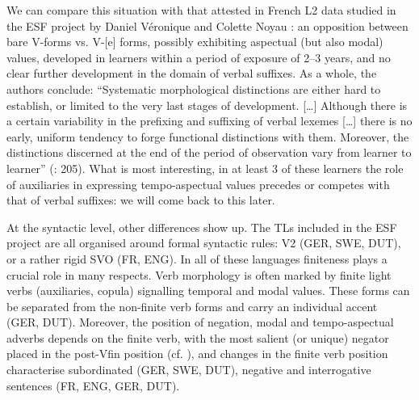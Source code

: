 \documentclass[output=paper]{langscibook}
\begin{document}
We can compare this situation with that attested in French L2 data studied in the ESF project by Daniel Véronique and Colette Noyau \citep{NoyauEtAl1995}: an opposition between bare V-forms vs. V-[e] forms, possibly exhibiting aspectual (but also modal) values, developed in learners within a period of exposure of 2--3 years, and no clear further development in the domain of verbal suffixes. As a whole, the authors conclude: “Systematic morphological distinctions are either hard to establish, or limited to the very last stages of development. […] Although there is a certain variability in the prefixing and suffixing of verbal lexemes […] there is no early, uniform tendency to forge functional distinctions with them. Moreover, the distinctions discerned at the end of the period of observation vary from learner to learner” (\citealt{NoyauEtAl1995}: 205). What is most interesting, in at least 3 of these learners the role of auxiliaries in expressing tempo-aspectual values precedes or competes with that of verbal suffixes: we will come back to this later.

At the syntactic level, other differences show up. The TLs included in the ESF project are all organised around formal syntactic rules: V2 (GER, SWE, DUT), or a rather rigid SVO (FR, ENG). In all of these languages finiteness plays a crucial role in many respects. Verb morphology is often marked by finite light verbs (auxiliaries, copula) signalling temporal and modal values. These forms can be separated from the non-finite verb forms and carry an individual accent (GER, DUT). Moreover, the position of negation, modal and tempo-aspectual adverbs depends on the finite verb, with the most salient (or unique) negator placed in the post-Vfin position (cf. ), and changes in the finite verb position characterise subordinated (GER, SWE, DUT), negative and interrogative sentences (FR, ENG, GER, DUT).
\end{document}
